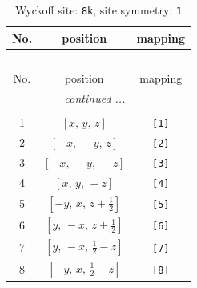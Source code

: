 \documentclass[fleqn,8pt]{jsarticle}
\begin{document}
\renewcommand{\arraystretch}{1.2}
\begin{longtable}{ccc}
\caption{Wyckoff site: {\tt 8k}, site symmetry: {\tt 1}}
 \\
 \hline \hline
No. & position & mapping \\ \hline \endfirsthead

\multicolumn{2}{l}{\tablename\ \thetable{}} \\
 \hline \hline
No. & position & mapping \\ \hline \endhead

 \hline \hline
\multicolumn{2}{r}{\footnotesize\it continued ...} \\ \endfoot

 \hline \hline
\multicolumn{2}{r}{} \\ \endlastfoot

1 & $\left[ x,\, y,\, z \right]$ & {\tt [1]} \\ \hline
2 & $\left[ - x,\, - y,\, z \right]$ & {\tt [2]} \\ \hline
3 & $\left[ - x,\, - y,\, - z \right]$ & {\tt [3]} \\ \hline
4 & $\left[ x,\, y,\, - z \right]$ & {\tt [4]} \\ \hline
5 & $\left[ - y,\, x,\, z + \frac{1}{2} \right]$ & {\tt [5]} \\ \hline
6 & $\left[ y,\, - x,\, z + \frac{1}{2} \right]$ & {\tt [6]} \\ \hline
7 & $\left[ y,\, - x,\, \frac{1}{2} - z \right]$ & {\tt [7]} \\ \hline
8 & $\left[ - y,\, x,\, \frac{1}{2} - z \right]$ & {\tt [8]} \\
\end{longtable}
\end{document}
